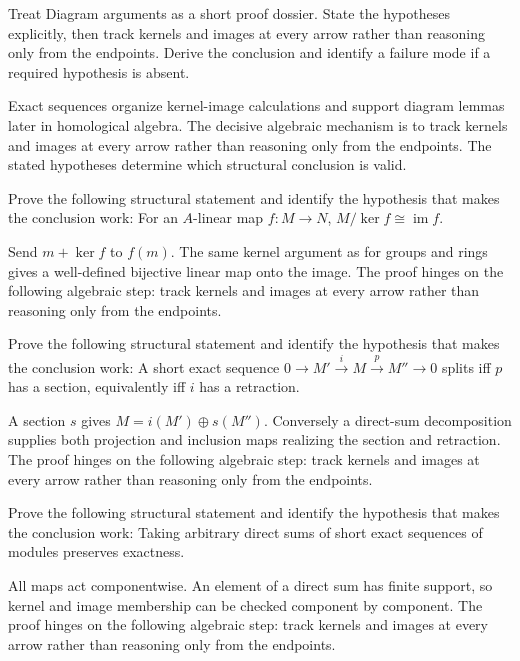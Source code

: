 \begin{problem}\label{prob:v09-problem-08}
Treat Diagram arguments as a short proof dossier. State the hypotheses explicitly, then track kernels and images at every arrow rather than reasoning only from the endpoints. Derive the conclusion and identify a failure mode if a required hypothesis is absent.
\end{problem}
\begin{solution}
Exact sequences organize kernel-image calculations and support diagram lemmas later in homological algebra. The decisive algebraic mechanism is to track kernels and images at every arrow rather than reasoning only from the endpoints. The stated hypotheses determine which structural conclusion is valid.
\end{solution}

\begin{problem}\label{prob:v09-problem-09}
Prove the following structural statement and identify the hypothesis that makes the conclusion work: For an $A$-linear map $f:M\to N$, $M/\ker f\cong\operatorname{im}f$.
\end{problem}
\begin{solution}
Send $m+\ker f$ to $f(m)$. The same kernel argument as for groups and rings gives a well-defined bijective linear map onto the image. The proof hinges on the following algebraic step: track kernels and images at every arrow rather than reasoning only from the endpoints.
\end{solution}

\begin{problem}\label{prob:v09-problem-10}
Prove the following structural statement and identify the hypothesis that makes the conclusion work: A short exact sequence $0\to M'\xrightarrow{i}M\xrightarrow{p}M''\to0$ splits iff $p$ has a section, equivalently iff $i$ has a retraction.
\end{problem}
\begin{solution}
A section $s$ gives $M=i(M')\oplus s(M'')$. Conversely a direct-sum decomposition supplies both projection and inclusion maps realizing the section and retraction. The proof hinges on the following algebraic step: track kernels and images at every arrow rather than reasoning only from the endpoints.
\end{solution}

\begin{problem}\label{prob:v09-problem-11}
Prove the following structural statement and identify the hypothesis that makes the conclusion work: Taking arbitrary direct sums of short exact sequences of modules preserves exactness.
\end{problem}
\begin{solution}
All maps act componentwise. An element of a direct sum has finite support, so kernel and image membership can be checked component by component. The proof hinges on the following algebraic step: track kernels and images at every arrow rather than reasoning only from the endpoints.
\end{solution}

